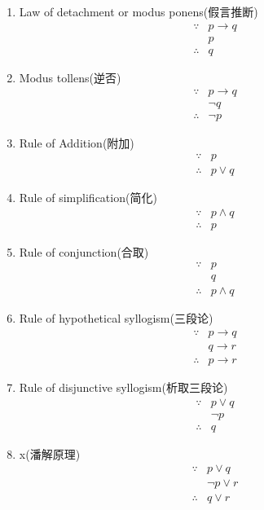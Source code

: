 \begin{enumerate}
    \item Law of detachment or modus ponens(假言推断)
    \begin{align*}
        \because& p\longrightarrow q \\&p\\
        \therefore& q
    \end{align*}
    \item Modus tollens(逆否)
    \begin{align*}
        \because& p\longrightarrow q \\ & \neg q \\
        \therefore & \neg p
    \end{align*}
    \item Rule of Addition(附加)
    \begin{align*}
        \because& p\\
        \therefore & p\lor q
    \end{align*}
    \item Rule of simplification(简化)
    \begin{align*}
        \because& p\land q\\
        \therefore & p
    \end{align*}
    \item Rule of conjunction(合取)
    \begin{align*}
        \because& p\\ & q \\
        \therefore & p\land q
    \end{align*}
    \item Rule of hypothetical syllogism(三段论)
    \begin{align*}
        \because& p\longrightarrow q \\ & q\longrightarrow r \\
        \therefore & p\longrightarrow r
    \end{align*}
    \item Rule of disjunctive syllogism(析取三段论)
    \begin{align*}
        \because& p\lor q \\ & \neg p \\
        \therefore & q
    \end{align*}
    \item x(潘解原理)
    \begin{align*}
        \because& p\lor q \\ & \neg p\lor r \\
        \therefore & q\lor r
    \end{align*}
\end{enumerate}

